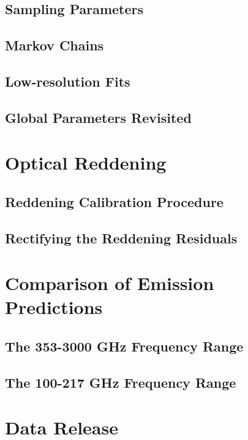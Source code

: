 \documentclass{emulateapj}
\begin{document}
\subsection{Sampling Parameters}
\label{sec:samp}

\subsection{Markov Chains}
\label{sec:mcmc}

\subsection{Low-resolution Fits}
\label{sec:lores}

\subsection{Global Parameters Revisited}
\label{sec:hier}

\section{Optical Reddening}
\label{sec:ebv}

\subsection{Reddening Calibration Procedure}
\label{sec:calib_ebv}

\subsection{Rectifying the Reddening Residuals}

\section{Comparison of Emission Predictions}
\label{sec:em_compare}

\subsection{The 353-3000 GHz Frequency Range}
\label{sec:hifreq}

\subsection{The 100-217 GHz Frequency Range}
\label{sec:lofreq}

\section{Data Release}
\label{sec:release}
\end{document}
